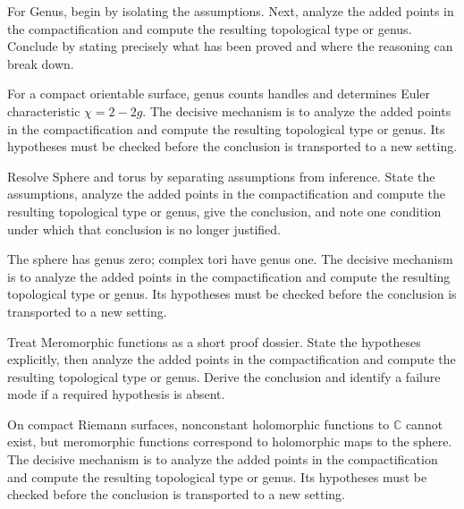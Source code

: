 \begin{problem}\label{prob:iv26-problem-04}
For Genus, begin by isolating the assumptions. Next, analyze the added points in the compactification and compute the resulting topological type or genus. Conclude by stating precisely what has been proved and where the reasoning can break down.
\end{problem}
\begin{solution}
For a compact orientable surface, genus counts handles and determines Euler characteristic $\chi=2-2g$. The decisive mechanism is to analyze the added points in the compactification and compute the resulting topological type or genus. Its hypotheses must be checked before the conclusion is transported to a new setting.
\end{solution}

\begin{problem}\label{prob:iv26-problem-05}
Resolve Sphere and torus by separating assumptions from inference. State the assumptions, analyze the added points in the compactification and compute the resulting topological type or genus, give the conclusion, and note one condition under which that conclusion is no longer justified.
\end{problem}
\begin{solution}
The sphere has genus zero; complex tori have genus one. The decisive mechanism is to analyze the added points in the compactification and compute the resulting topological type or genus. Its hypotheses must be checked before the conclusion is transported to a new setting.
\end{solution}

\begin{problem}\label{prob:iv26-problem-06}
Treat Meromorphic functions as a short proof dossier. State the hypotheses explicitly, then analyze the added points in the compactification and compute the resulting topological type or genus. Derive the conclusion and identify a failure mode if a required hypothesis is absent.
\end{problem}
\begin{solution}
On compact Riemann surfaces, nonconstant holomorphic functions to $\mathbb C$ cannot exist, but meromorphic functions correspond to holomorphic maps to the sphere. The decisive mechanism is to analyze the added points in the compactification and compute the resulting topological type or genus. Its hypotheses must be checked before the conclusion is transported to a new setting.
\end{solution}

